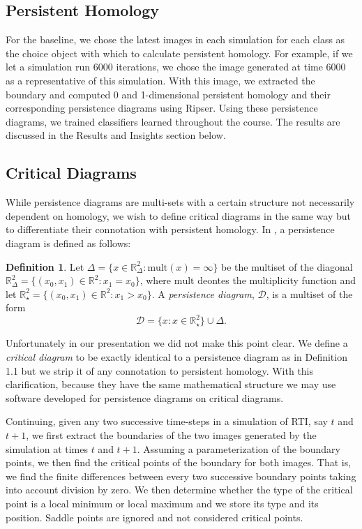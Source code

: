 \documentclass[12pt, fullpage,letterpaper]{article}
\theoremstyle{definition}
\newtheorem{definition}{Definition}[section]
\begin{document}
	\subsection*{\normalfont Persistent Homology}
	For the baseline, we chose the latest images in each simulation for each class as the choice object with which to calculate persistent homology. For example, if we let a simulation run 6000 iterations, we chose the image generated at time 6000 as a representative of this simulation. With this image, we extracted the boundary and computed 0 and 1-dimensional persistent homology and their corresponding persistence diagrams using Ripser. Using these persistence diagrams, we trained classifiers learned throughout the course. The results are discussed in the Results and Insights section below.
	
	\subsection*{\normalfont Critical Diagrams} 
	While persistence diagrams are multi-sets with a certain structure not necessarily dependent on homology, we wish to define critical diagrams in the same way but to differentiate their connotation with persistent homology. In \cite{Hofer}, a persistence diagram is defined as follows:
	\theoremstyle{definition}
	\begin{definition}
		Let $\Delta = \{ x\in \mathbb{R}^2_{\Delta} : \textrm{mult}(x) = \infty \}$ be the multiset of the diagonal $\mathbb{R}^2_{\Delta} = \{ (x_0, x_1) \in \mathbb{R}^2 : x_1 = x_0 \}$, where $\textrm{mult}$ deontes the multiplicity function and let $\mathbb{R}_{\star}^2 = \{ (x_0, x_1) \in \mathbb{R}^2 : x_1 > x_0 \}$. A \emph{persistence diagram}, $\mathcal{D}$, is a multiset of the form
		$$
			\mathcal{D} = \{x: x \in \mathbb{R}_{\star}^2  \} \cup \Delta.
		$$
	\end{definition}
	Unfortunately in our presentation we did not make this point clear. We define a \emph{critical diagram} to be exactly identical to a persistence diagram as in Definition 1.1 but we strip it of any connotation to persistent homology. With this clarification, because they have the same mathematical structure we may use software developed for persistence diagrams on critical diagrams. 
	
	Continuing, given any two successive time-steps in a simulation of RTI, say $t$ and $t + 1$, we first extract the boundaries of the two images generated by the simulation at times $t$ and $t + 1$. Assuming a parameterization of the boundary points, we then find the critical points of the boundary for both images. That is, we find the finite differences between every two successive boundary points taking into account division by zero. We then determine whether the type of the critical point is a local minimum or local maximum and we store its type and its position. Saddle points are ignored and not considered critical points. 
	
\end{document}
